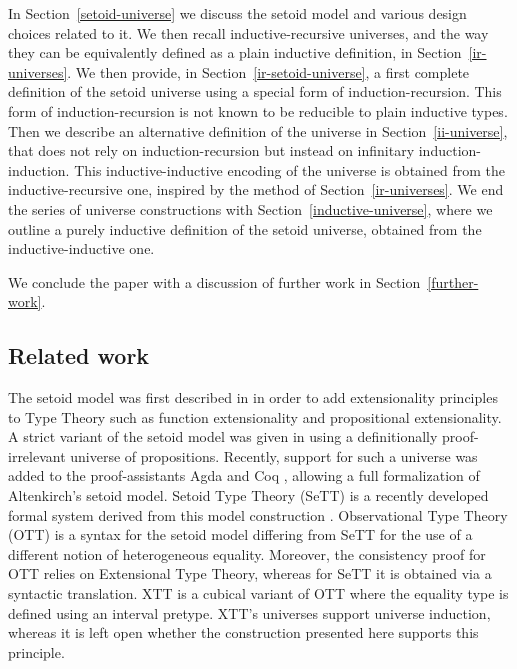 \documentclass[a4paper,UKenglish,cleveref, autoref, thm-restate]{lipics-v2019}
\begin{document}
In Section~\ref{setoid-universe} we discuss the setoid model and various design
choices related to it. We then recall inductive-recursive universes, and the way
they can be equivalently defined as a plain inductive definition, in
Section~\ref{ir-universes}.
%
We then provide, in Section~\ref{ir-setoid-universe}, a first complete
definition of the setoid universe using a special form of induction-recursion.
This form of induction-recursion is not known to be reducible to plain inductive types.
Then we describe an alternative definition of the universe in
Section~\ref{ii-universe}, that does not rely on induction-recursion but instead
on infinitary induction-induction. This inductive-inductive encoding of the
universe is obtained from the inductive-recursive one, inspired by the method of
Section~\ref{ir-universes}.
%
We end the series of universe constructions with
Section~\ref{inductive-universe}, where we outline a purely inductive definition
of the setoid universe, obtained from the inductive-inductive one.

We conclude the paper with a discussion of further work in
Section~\ref{further-work}.

\subsection{Related work}

The setoid model was first described in \cite{hofmann} in order to add
extensionality principles to Type Theory such as function extensionality and
propositional extensionality. A strict variant of the setoid model was given in
\cite{setoid99} using a definitionally proof-irrelevant universe of
propositions. Recently, support for such a universe was added to the
proof-assistants Agda and Coq \cite{agda-prop}, allowing a full formalization of
Altenkirch's setoid model. Setoid Type Theory (SeTT) is a recently developed
formal system derived from this model construction \cite{mpc19}. Observational
Type Theory (OTT) \cite{alti:ott-conf, alti:ott-conf} is a syntax for the setoid
model differing from SeTT for the use of a different notion of heterogeneous
equality. Moreover, the consistency proof for OTT relies on Extensional Type
Theory, whereas for SeTT it is obtained via a syntactic translation.
%
XTT \cite{xtt} is a cubical variant of OTT where the equality type is defined
using an interval pretype. XTT's universes support universe induction, whereas
it is left open whether the construction presented here supports this principle.
\end{document}
